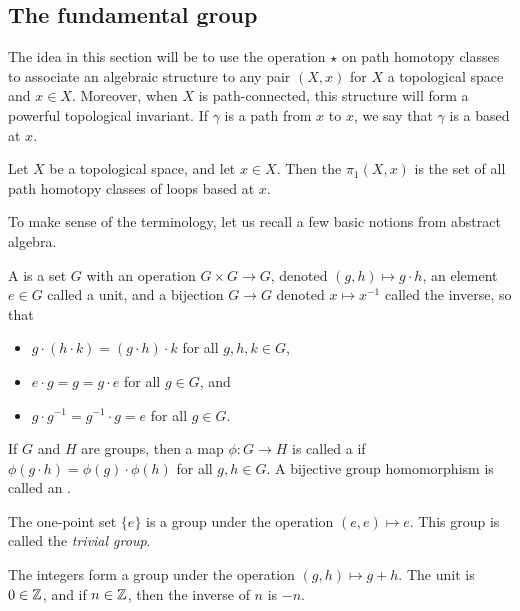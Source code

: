 \subsection{The fundamental group}
The idea in this section will be to use the operation $\star$ on path homotopy classes to associate an algebraic structure to any pair $(X,x)$ for $X$ a topological space and $x \in X$. Moreover, when $X$ is path-connected, this structure will form a powerful topological invariant. If $\gamma$ is a path from $x$ to $x$, we say that $\gamma$ is a  based at $x$.
\begin{defn}
  Let $X$ be a topological space, and let $x \in X$. Then the  $\pi_1(X,x)$ is the set of all path homotopy classes of loops based at $x$. 
\end{defn}
To make sense of the terminology, let us recall a few basic notions from abstract algebra.
\begin{defn}
  A  is a set $G$ with an operation $G \times G \to G$, denoted $(g,h) \mapsto g \cdot h$, an element $e \in G$ called a unit, and a bijection $G \to G$ denoted $x \mapsto x^{-1}$ called the inverse, so that
  \begin{itemize}
    \item $g \cdot (h \cdot k) = (g \cdot h) \cdot k$ for all $g,h,k \in G$,
    \item $e \cdot g = g = g \cdot e$ for all $g \in G$, and
    \item $g \cdot g^{-1} = g^{-1} \cdot g = e$ for all $g \in G$.
  \end{itemize}
  If $G$ and $H$ are groups, then a map $\phi : G \to H$ is called a  if $\phi(g\cdot h) = \phi(g)\cdot\phi(h)$ for all $g,h \in G$. A bijective group homomorphism is called an .
\end{defn}
\begin{example}
  The one-point set $\{e\}$ is a group under the operation $(e,e) \mapsto e$. This group is called the \emph{trivial group}.
\end{example}
\begin{example}
  The integers form a group under the operation $(g,h) \mapsto g+h$. The unit is $0 \in \mathbb{Z}$, and if $n \in \mathbb{Z}$, then the inverse of $n$ is $-n$.
\end{example}
